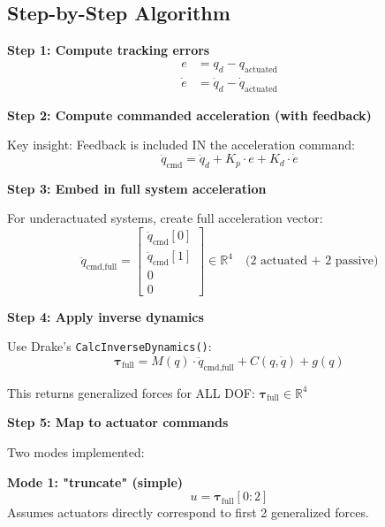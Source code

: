 \subsection*{Step-by-Step Algorithm}

\textbf{Step 1: Compute tracking errors}
\begin{align}
e &= q_d - q_{\text{actuated}} \\
\dot{e} &= \dot{q}_d - \dot{q}_{\text{actuated}}
\end{align}

\textbf{Step 2: Compute commanded acceleration (with feedback)}

Key insight: Feedback is included IN the acceleration command:
\begin{equation}
\ddot{q}_{\text{cmd}} = \ddot{q}_d + K_p \cdot e + K_d \cdot \dot{e}
\tag{Commanded Accel}
\end{equation}

\textbf{Step 3: Embed in full system acceleration}

For underactuated systems, create full acceleration vector:
\begin{equation}
\ddot{q}_{\text{cmd,full}} = 
\begin{bmatrix}
\ddot{q}_{\text{cmd}}[0] \\
\ddot{q}_{\text{cmd}}[1] \\
0 \\
0
\end{bmatrix}
\in \mathbb{R}^{4}
\quad
\text{(2 actuated + 2 passive)}
\end{equation}

\textbf{Step 4: Apply inverse dynamics}

Use Drake's \texttt{CalcInverseDynamics()}:
\begin{equation}
\boldsymbol{\tau}_{\text{full}} = M(q) \cdot \ddot{q}_{\text{cmd,full}} + C(q,\dot{q}) + g(q)
\tag{Inverse Dynamics}
\end{equation}

This returns generalized forces for ALL DOF: $\boldsymbol{\tau}_{\text{full}} \in \mathbb{R}^{4}$

\textbf{Step 5: Map to actuator commands}

Two modes implemented:

\textbf{Mode 1: "truncate" (simple)}
\begin{equation}
u = \boldsymbol{\tau}_{\text{full}}[0:2]
\end{equation}
Assumes actuators directly correspond to first 2 generalized forces.

